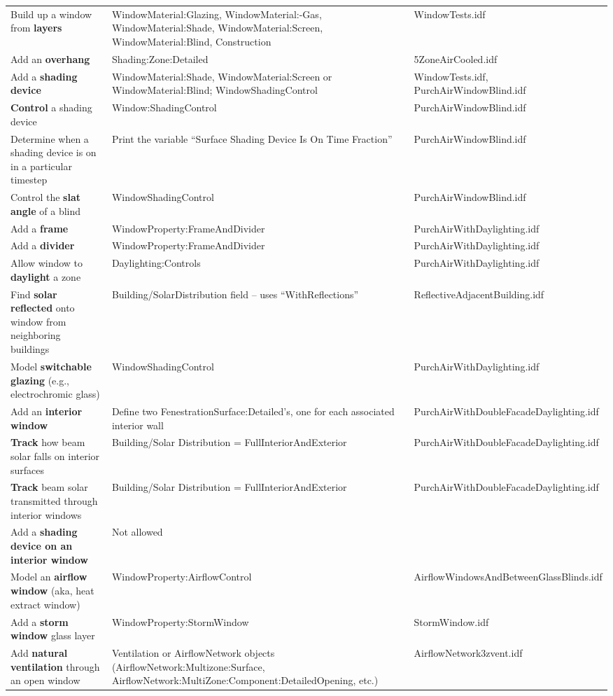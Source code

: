 \begin{longtable}[c]{p{2.0in}p{2.0in}p{2.0in}}
Build up a window from \textbf{layers} & Window\-Material:\-Glazing, Window\-Material:-Gas, Window\-Material:\-Shade, Window\-Material:\-Screen, Window\-Material:\-Blind, Construction & Window\-Tests.idf \tabularnewline
Add an \textbf{overhang} & Shading:\-Zone:\-Detailed & 5Zone\-Air\-Cooled.idf \tabularnewline
Add a \textbf{shading device} & Window\-Material:\-Shade, Window\-Material:\-Screen or Window\-Material:\-Blind; Window\-Shading\-Control & Window\-Tests.idf, Purch\-Air\-Window\-Blind.idf \tabularnewline
\textbf{Control} a shading device & Window:\-Shading\-Control & Purch\-Air\-WindowBlind.idf \tabularnewline
Determine when a shading device is on in a particular timestep & Print the variable ``Surface Shading Device Is On Time Fraction'' & Purch\-Air\-Window\-Blind.idf \tabularnewline
Control the \textbf{slat angle} of a blind & Window\-Shading\-Control & Purch\-Air\-Window\-Blind.idf \tabularnewline
Add a \textbf{frame} & Window\-Property:\-FrameAndDivider & Purch\-Air\-With\-Day\-lighting.idf \tabularnewline
Add a \textbf{divider} & Window\-Property:\-Frame\-And\-Divider & Purch\-Air\-With\-Day\-lighting.idf \tabularnewline
Allow window to \textbf{daylight} a zone & Day\-lighting:Controls & Purch\-Air\-With\-Day\-lighting.idf \tabularnewline
Find \textbf{solar reflected} onto window from neighboring buildings & Building/\-Solar\-Distribution field – uses ``WithReflections'' & Reflective\-Adjacent\-Building.idf \tabularnewline
Model \textbf{switchable glazing} (e.g., electrochromic glass) & Window\-Shading\-Control & Purch\-Air\-With\-Day\-lighting.idf \tabularnewline
Add an \textbf{interior window} & Define two Fenestration\-Surface:\-Detailed's, one for each associated interior wall & Purch\-Air\-With\-Double\-Facade\-Day\-lighting.idf \tabularnewline
\textbf{Track} how beam solar falls on interior surfaces & Building/\-Solar Distribution = Full\-Interior\-And\-Exterior & Purch\-Air\-With\-Double\-Facade\-Day\-lighting.idf \tabularnewline
\textbf{Track} beam solar transmitted through interior windows & Building/Solar Distribution = Full\-Interior\-And\-Exterior & Purch\-Air\-With\-Double\-Facade\-Day\-lighting.idf \tabularnewline
Add a \textbf{shading device on an interior window} & Not allowed & \tabularnewline
Model an \textbf{airflow window} (aka, heat extract window) & Window\-Property:\-Air\-flow\-Control & Air\-flow\-Windows\-And\-Between\-Glass\-Blinds.idf \tabularnewline
Add a \textbf{storm window} glass layer & Window\-Property:\-Storm\-Window & Storm\-Window.idf \tabularnewline
Add \textbf{natural ventilation} through an open window & Ventilation or Airflow\-Network objects (Airflow\-Network:\-Multizone:\-Surface, Airflow\-Network:\-Multi\-Zone:\-Component:\-Detailed\-Opening, etc.) & Airflow\-Network\-3zvent.idf \tabularnewline

\end{longtable}
